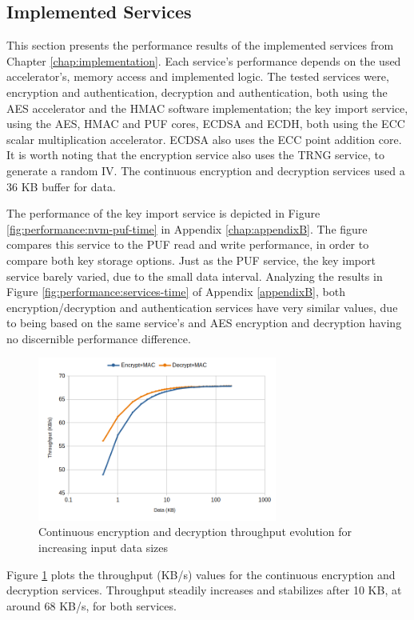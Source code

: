 \subsection{Implemented Services}\label{chap:evaluation:services}

This section presents the performance results of the implemented services from Chapter \ref{chap:implementation}. Each service's performance depends on the used accelerator's, memory access and implemented logic.
The tested services were, encryption and authentication, decryption and authentication, both using the AES accelerator and the HMAC software implementation; the key import service, using the AES, HMAC and PUF cores, ECDSA and ECDH, both using the ECC scalar multiplication accelerator. ECDSA also uses the ECC point addition core. It is worth noting that the encryption service also uses the TRNG service, to generate a random IV. 
The continuous encryption and decryption services used a 36 KB buffer for data.

The performance of the key import service is depicted in Figure \ref{fig:performance:nvm-puf-time} in Appendix \ref{chap:appendixB}. The figure compares this service to the PUF read and write performance, in order to compare both key storage options.
Just as the PUF service, the key import service barely varied, due to the small data interval.
Analyzing the results in Figure	\ref{fig:performance:services-time} of Appendix	\ref{appendixB}, both encryption/decryption and authentication services have very similar values, due to being based on the same service's and AES encryption and decryption having no discernible performance difference.

\begin{figure}[h!]
	\centering
	\includegraphics[width=0.7\textwidth]{./Images/services-tput.png}
	\caption{Continuous encryption and decryption throughput evolution for increasing input data sizes}
	\label{fig:performance:services-tput}
\end{figure}
Figure \ref{fig:performance:services-tput} plots the throughput (KB/s) values for the continuous encryption and decryption services. Throughput steadily increases and stabilizes after 10 KB, at around 68 KB/s, for both services.


